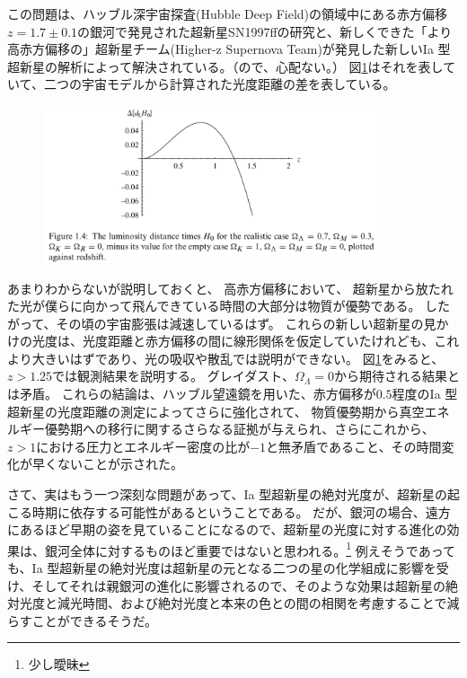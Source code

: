 \documentclass[11pt]{ltjsarticle}
\theoremstyle{plain}
\theoremstyle{break}
\begin{document}
この問題は、ハッブル深宇宙探査(Hubble Deep Field)の領域中にある赤方偏移$z = 1.7 \pm 0.1$の銀河で発見された超新星SN1997ffの研究と、新しくできた「より高赤方偏移の」超新星チーム(Higher-z Supernova Team)が発見した新しいIa 型超新星の解析によって解決されている。（ので、心配ない。）
図\ref{fig:1-4}はそれを表していて、二つの宇宙モデルから計算された光度距離の差を表している。
\begin{figure}[h]
	\centering
	\includegraphics[width=10cm]{figure/fig1-4}
	\label{fig:1-4}
	\caption{}
\end{figure}%
あまりわからないが説明しておくと、
高赤方偏移において、
超新星から放たれた光が僕らに向かって飛んできている時間の大部分は物質が優勢である。
したがって、その頃の宇宙膨張は減速しているはず。
これらの新しい超新星の見かけの光度は、光度距離と赤方偏移の間に線形関係を仮定していたけれども、これより大きいはずであり、光の吸収や散乱では説明ができない。
図\ref{fig:1-4}をみると、$z>1.25$では観測結果を説明する。
グレイダスト、$\Omega_{\Lambda} = 0$から期待される結果とは矛盾。
これらの結論は、ハッブル望遠鏡を用いた、赤方偏移が$0.5$程度のIa 型超新星の光度距離の測定によってさらに強化されて、
物質優勢期から真空エネルギー優勢期への移行に関するさらなる証拠が与えられ、さらにこれから、$z>1$における圧力とエネルギー密度の比が$-1$と無矛盾であること、その時間変化が早くないことが示された。

さて、実はもう一つ深刻な問題があって、Ia 型超新星の絶対光度が、超新星の起こる時期に依存する可能性があるということである。
だが、銀河の場合、遠方にあるほど早期の姿を見ていることになるので、超新星の光度に対する進化の効果は、銀河全体に対するものほど重要ではないと思われる。\footnote{少し曖昧}
例えそうであっても、Ia 型超新星の絶対光度は超新星の元となる二つの星の化学組成に影響を受け、そしてそれは親銀河の進化に影響されるので、そのような効果は超新星の絶対光度と減光時間、および絶対光度と本来の色との間の相関を考慮することで減らすことができるそうだ。
\end{document}
